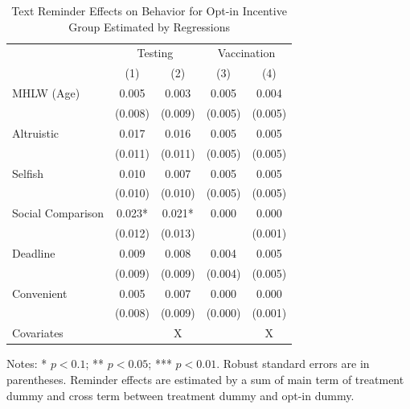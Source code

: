 \documentclass[
]{article}
\begin{document}
\begin{table}

\caption{\label{tab:lh-act}Text Reminder Effects on Behavior for Opt-in Incentive Group Estimated by Regressions}
\centering
\fontsize{9}{11}\selectfont
\begin{threeparttable}
\begin{tabular}[t]{lcccc}
\toprule
\multicolumn{1}{c}{ } & \multicolumn{2}{c}{Testing} & \multicolumn{2}{c}{Vaccination} \\
\cmidrule(l{3pt}r{3pt}){2-3} \cmidrule(l{3pt}r{3pt}){4-5}
  & (1) & (2) & (3) & (4)\\
\midrule
MHLW (Age) & \num{0.005} & \num{0.003} & \num{0.005} & \num{0.004}\\
 & (\num{0.008}) & (\num{0.009}) & (\num{0.005}) & (\num{0.005})\\
Altruistic & \num{0.017} & \num{0.016} & \num{0.005} & \num{0.005}\\
 & (\num{0.011}) & (\num{0.011}) & (\num{0.005}) & (\num{0.005})\\
Selfish & \num{0.010} & \num{0.007} & \num{0.005} & \num{0.005}\\
 & (\num{0.010}) & (\num{0.010}) & (\num{0.005}) & (\num{0.005})\\
Social Comparison & \num{0.023}* & \num{0.021}* & \num{0.000} & \num{0.000}\\
 & (\num{0.012}) & (\num{0.013}) &  & (\num{0.001})\\
Deadline & \num{0.009} & \num{0.008} & \num{0.004} & \num{0.005}\\
 & (\num{0.009}) & (\num{0.009}) & (\num{0.004}) & (\num{0.005})\\
Convenient & \num{0.005} & \num{0.007} & \num{0.000} & \num{0.000}\\
 & (\num{0.008}) & (\num{0.009}) & (\num{0.000}) & (\num{0.001})\\
Covariates &  & X &  & X\\
\bottomrule
\end{tabular}
\begin{tablenotes}
\item  Notes: * $p < 0.1$; ** $p < 0.05$; *** $p < 0.01$. Robust standard errors are in parentheses. Reminder effects are estimated by a sum of main term of treatment dummy and cross term between treatment dummy and opt-in dummy.
\end{tablenotes}
\end{threeparttable}
\end{table}
\end{document}
